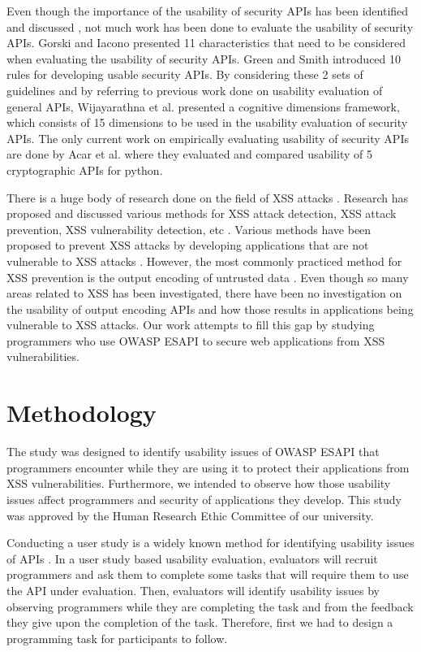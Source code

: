 \documentclass[10pt]{article}
\begin{document}
Even though the importance of the usability of security APIs has been identified and discussed \cite{acar,acargit,mindermann,wurster}, not much work has been done to evaluate the usability of security APIs. Gorski and Iacono \cite{gorski} presented 11 characteristics
that need to be considered when evaluating the
usability of security APIs. Green and Smith \cite{green2016developers} introduced
10 rules for developing usable security APIs. By considering
these 2 sets of guidelines and by referring to previous work
done on usability evaluation of general APIs, Wijayarathna et al. \cite{wijaya} presented a cognitive dimensions
framework, which consists of 15 dimensions to be used in
the usability evaluation of security APIs. The only current
work on empirically evaluating usability of security APIs are
done by Acar et al. \cite{acar} where they evaluated and compared usability of 5 cryptographic APIs for python.

There is a huge body of research done on the field of XSS attacks \cite{hydara2015current}. Research has proposed and discussed various methods for XSS attack detection, XSS attack prevention, XSS vulnerability detection, etc \cite{hydara2015current}. Various methods have been proposed to prevent XSS attacks by developing applications that are not vulnerable to XSS attacks \cite{hydara2015current,bathia2011assisting}. However, the most commonly practiced method for XSS prevention is the output encoding of untrusted data \cite{owasp10cheat}. Even though so many areas related to XSS has been investigated, there have been no investigation on the usability of output encoding APIs and how those results in applications being vulnerable to XSS attacks. Our work attempts to fill this gap by studying programmers who use OWASP ESAPI to secure web applications from XSS vulnerabilities.

\section{Methodology}

The study was designed to identify usability issues of OWASP ESAPI that programmers encounter while they are using it to protect their applications from XSS vulnerabilities. Furthermore, we intended to observe how those usability issues affect programmers and security of applications they develop. This study was approved by the Human Research Ethic Committee of our university.

Conducting a user study is a widely known method for identifying usability issues of APIs \cite{wijaya,acar}. In a user study based usability evaluation, evaluators will recruit programmers and ask them to complete some tasks that will require them to use the API under evaluation. Then, evaluators will identify usability issues by observing programmers while they are completing the task and from the feedback they give upon the completion of the task. Therefore, first we had to design a programming task for participants to follow. 
\end{document}
